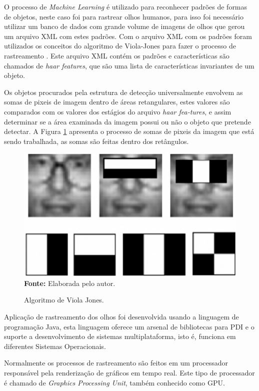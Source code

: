 O processo de \textit{Machine Learning} é utilizado para reconhecer padrões de formas de objetos, neste caso foi para rastrear olhos humanos, para isso foi necessário utilizar um banco de dados com grande volume de imagens de olhos que gerou um arquivo XML com estes padrões. Com o arquivo XML com os padrões foram utilizados os conceitos do algoritmo de Viola-Jones para fazer o processo de rastreamento \cite{viola2001rapid}. Este arquivo XML contém os padrões e características são chamados de \textit{haar features}, que são uma lista de características invariantes de um objeto.

Os objetos procurados pela estrutura de detecção universalmente envolvem as somas de pixeis de imagem dentro de áreas retangulares, estes valores são comparados com os valores dos estágios do arquivo \textit{haar fea-tures}, e assim determinar se a área examinada da imagem possui ou não o objeto que pretende detectar. A Figura \ref{fig:viola-jones-ret} apresenta o processo de somas de pixeis da imagem que está sendo trabalhada, as somas são feitas dentro dos retângulos. 

\begin{figure}[htbp]
\caption{Algoritmo de Viola Jones.} 
\centering \includegraphics[scale=1]{img/viola-jones-ret.png}
\textbf{Fonte:} Elaborada pelo autor.
\label{fig:viola-jones-ret}
\end{figure}

Aplicação de rastreamento dos olhos foi desenvolvida usando a linguagem de programação Java, esta linguagem oferece um arsenal de bibliotecas para PDI e o suporte a desenvolvimento de sistemas multiplataforma, isto é, funciona em diferentes Sistemas Operacionais. 

Normalmente os processos de rastreamento são feitos em um processador responsável pela renderização de gráficos em tempo real. Este tipo de processador é chamado de \textit{Graphics Processing Unit}, também conhecido como GPU.

